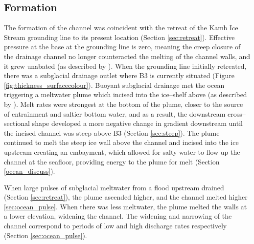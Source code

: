 \subsection{Formation}
The formation of the channel was coincident with the retreat of the Kamb Ice Stream grounding line to its present location (Section \ref{sec:retreat}). Effective pressure at the base at the grounding line is zero, meaning the creep closure of the drainage channel no longer counteracted the melting of the channel walls, and it grew unabated (as described by \cite{drews2015evolution}). 
When the grounding line initially retreated, there was a subglacial drainage outlet where B3 is currently situated (Figure \ref{fig:thickness_surfacecolour}). Buoyant subglacial drainage met the ocean triggering a meltwater plume which incised into the ice--shelf above (as described by \cite{hewitt2020subglacial}). Melt rates were strongest at the bottom of the plume, closer to the source of entrainment and saltier bottom water, and as a result, the downstream cross--sectional shape developed a more negative change in gradient downstream until the incised channel was steep above B3 (Section \ref{sec:steep}). The plume continued to melt the steep ice wall above the channel and incised into the ice upstream creating an embayment, which allowed for salty water to flow up the channel at the seafloor, providing energy to the plume for melt (Section \ref{ocean_discuss}). 

When large pulses of subglacial meltwater from a flood upstream drained (Section \ref{sec:retreat}), the plume ascended higher, and the channel melted higher \ref{sec:ocean_pulse}. When there was less meltwater, the plume melted the walls at a lower elevation, widening the channel. The widening and narrowing of the channel correspond to periods of low and high discharge rates respectively (Section \ref{sec:ocean_pulse}).







